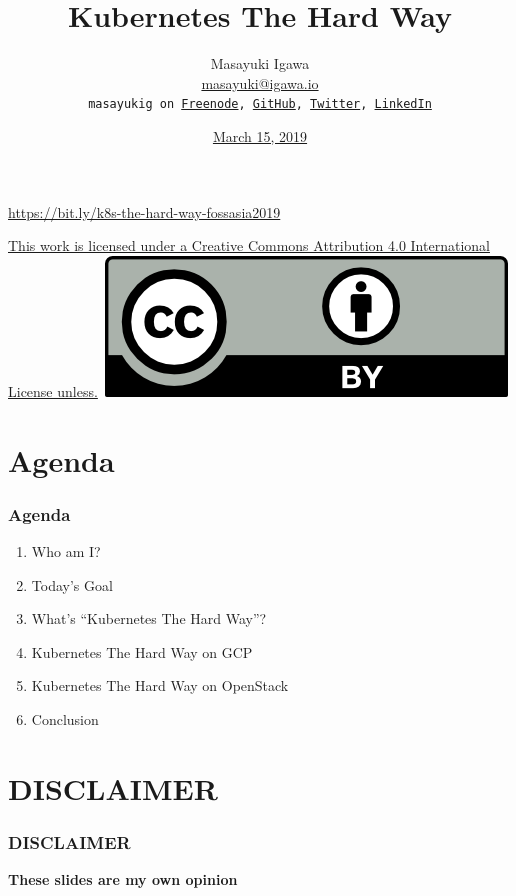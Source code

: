 \documentclass[aspectratio=169,11pt,hyperref={colorlinks=true}]{beamer}
\author[Masayuki Igawa]{%
    \texorpdfstring{%
            \centering
            Masayuki Igawa\\
            \href{mailto:masayuki@igawa.io}{masayuki@igawa.io}\\
            \texttt{masayukig on
              \href{https://freenode.net/}{Freenode},
              \href{https://github.com/masayukig}{GitHub},
              \href{https://twitter.com/masayukig}{Twitter},
              \href{https://www.linkedin.com/in/masayukig/}{LinkedIn}}
    }
    {Masayuki Igawa}
}
\date{\href{https://2019.fossasia.org/event/schedule.html}{March 15, 2019}}
\title[k8s-the-hard-way
  \hspace{4em}\insertframenumber/\inserttotalframenumber]{\Huge{Kubernetes The Hard Way}}
\begin{document}
{%
\begin{frame}[noframenumbering]
  \hypersetup{colorlinks,urlcolor=suse}
  \titlepage{}
  \centering
  \@place \par
  \href{https://bit.ly/k8s-the-hard-way-fossasia2019}{https://bit.ly/k8s-the-hard-way-fossasia2019}
  \begin{flushright}
    \tiny\href{https://creativecommons.org/licenses/by/4.0/}{This work
      is licensed under a Creative Commons Attribution 4.0
      International License unless.}~\includegraphics[scale=0.3]{images/cc_by.png}
  \end{flushright}
\end{frame}
}

\section{Agenda}
\begin{frame}
  \frametitle{Agenda}
  \begin{enumerate}
    \item Who am I?
    \item Today's Goal
    \item What's ``Kubernetes The Hard Way''?
    \item Kubernetes The Hard Way on GCP
    \item Kubernetes The Hard Way on OpenStack
    \item Conclusion
  \end{enumerate}
\end{frame}

\section{DISCLAIMER}
\begin{frame}
  \frametitle{DISCLAIMER}
  \Huge{\bf{These slides are my own opinion}}
\end{frame}
\end{document}
